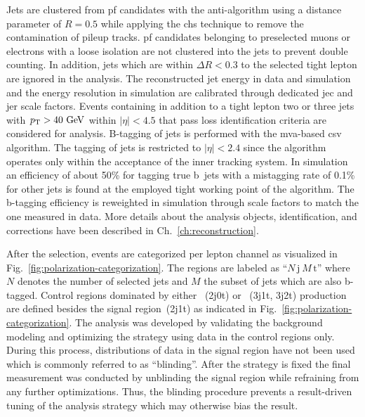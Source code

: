 Jets are clustered from \gls{pf} candidates with the anti-\kt algorithm using a distance parameter of $R=0.5$ while applying the \gls{chs} technique to remove the contamination of pileup tracks. \gls{pf} candidates belonging to preselected muons or electrons with a loose isolation are not clustered into the jets to prevent double counting. In addition, jets which are within $\Delta R<0.3$ to the selected tight lepton are ignored in the analysis. The reconstructed jet energy in data and simulation and the energy resolution in simulation are calibrated through dedicated \gls{jec} and \gls{jer} scale factors. Events containing in addition to a tight lepton two or three jets with $p_\mathrm{T}>40~\mathrm{GeV}$ within $|\eta|<4.5$ that pass loss identification criteria are considered for analysis. B-tagging of jets is performed with the \gls{mva}-based \gls{csv} algorithm. The tagging of jets is restricted to $|\eta|<2.4$ since the algorithm operates only within the acceptance of the inner tracking system. In simulation an efficiency of about 50\% for tagging true b~jets with a mistagging rate of 0.1\% for other jets is found at the employed tight working point of the algorithm. The b-tagging efficiency is reweighted in simulation through scale factors to match the one measured in data. More details about the analysis objects, identification, and corrections have been described in Ch.~\ref{ch:reconstruction}.

After the selection, events are categorized per lepton channel as visualized in Fig.~\ref{fig:polarization-categorization}. The regions are labeled as ``$N\,\mathrm{j}~M\,\mathrm{t}$'' where $N$ denotes the number of selected jets and $M$ the subset of jets which are also b-tagged. Control regions dominated by either \wjets~(2j0t) or \ttbar~(3j1t, 3j2t) production are defined besides the signal region~(2j1t) as indicated in Fig.~\ref{fig:polarization-categorization}. The analysis was developed by validating the background modeling and optimizing the strategy using data in the control regions only. During this process, distributions of data in the signal region have not been used which is commonly referred to as ``blinding''. After the strategy is fixed the final measurement was conducted by unblinding the signal region while refraining from any further optimizations. Thus, the blinding procedure prevents a result-driven tuning of the analysis strategy which may otherwise bias the result.



